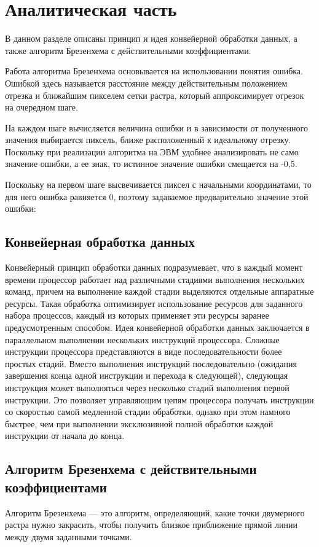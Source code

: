 \documentclass[12pt]{report}
\begin{document}
\chapter{Аналитическая часть}
В данном разделе описаны принцип и идея конвейерной обработки данных, а также алгоритм Брезенхема с действительными коэффициентами.

Работа алгоритма Брезенхема основывается на использовании понятия ошибка. Ошибкой здесь называется расстояние между действительным положением отрезка и ближайшим пикселем сетки растра, который аппроксимирует отрезок на очередном шаге.

На каждом шаге вычисляется величина ошибки и в зависимости от полученного значения выбирается пиксель, ближе расположенный к идеальному отрезку. Поскольку при реализации алгоритма на ЭВМ удобнее анализировать не само значение ошибки, а ее знак, то истинное значение ошибки смещается на -0,5.

Поскольку на первом шаге высвечивается пиксел с начальными координатами, то для него ошибка равняется 0, поэтому задаваемое предварительно значение этой ошибки:



\section{Конвейерная обработка данных}
Конвейерный принцип обработки данных подразумевает, что в каждый момент времени процессор работает над различными стадиями выполнения нескольких команд, причем на выполнение каждой стадии выделяются отдельные аппаратные ресурсы. Такая обработка оптимизирует использование ресурсов для заданного набора процессов, каждый из которых применяет эти ресурсы заранее предусмотренным способом.
Идея конвейерной обработки данных заключается в параллельном выполнении нескольких инструкций процессора. Сложные инструкции процессора представляются в виде последовательности более простых стадий. Вместо выполнения инструкций последовательно (ожидания завершения конца одной инструкции и перехода к следующей), следующая инструкция может выполняться через несколько стадий выполнения первой инструкции. Это позволяет управляющим цепям процессора получать инструкции со скоростью самой медленной стадии обработки, однако при этом намного быстрее, чем при выполнении эксклюзивной полной обработки каждой инструкции от начала до конца.

\section{Алгоритм Брезенхема с действительными коэффициентами}
Алгоритм Брезенхема — это алгоритм, определяющий, какие точки двумерного растра нужно закрасить, чтобы получить близкое приближение прямой линии между двумя заданными точками.
\end{document}

